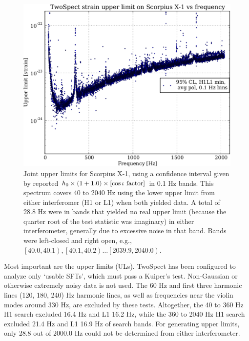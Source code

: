 \begin{figure}
\begin{center}
\includegraphics[width=0.68\paperwidth,height=0.48\paperheight]{plots/ScoX1ULs.eps}
\caption{
Joint upper limits for Scorpius X-1, using a confidence interval given by reported $h_0 \times \left( 1 + 1.0 \right) \times \left[\cos\iota \textup{ factor}\right]$ in 0.1 Hz bands. 
This spectrum covers 40 to 2040 Hz using the lower upper limit from either interferomer (H1 or L1) when both yielded data. 
A total of 28.8 Hz were in bands that yielded no real upper limit (because the quarter root of the test statistic was imaginary) in either interferometer, generally due to excessive noise in that band.
Bands were left-closed and right open, e.g., $\left[ 40.0,40.1\right), \left[ 40.1,40.2\right)\ldots \left[2039.9,2040.0\right)$.
}
\label{S6_H1L1_UL}
\end{center}
\end{figure}

Most important are the upper limits (ULs).
TwoSpect has been configured to analyze only `usable SFTs', which must pass a Kuiper's test.
Non-Gaussian or otherwise extremely noisy data is not used.
The 60 Hz and first three harmonic lines (120, 180, 240) Hz harmonic lines, as well as frequencies near the violin modes around 330 Hz, are excluded by these tests.
Altogether, the 40 to 360 Hz H1 search excluded 16.4 Hz and L1 16.2 Hz, while the 360 to 2040 Hz H1 search excluded 21.4 Hz and L1 16.9 Hz of search bands.
For generating upper limits, only 28.8 out of 2000.0 Hz could not be determined from either interferometer.

